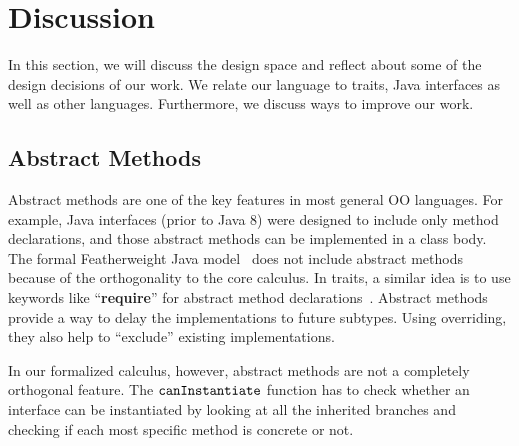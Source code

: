 \section{Discussion}\label{sec:discussion}
In this section, we will discuss the design space and reflect about some of the design decisions of our work. We relate our language to traits, Java interfaces as well as other languages. Furthermore, we discuss ways to improve our work.


\subsection{Abstract Methods}
Abstract methods are one of the key features in most general OO
languages. For example, Java interfaces (prior to Java 8) were designed
to include only method declarations, and those abstract methods can be implemented in a class body. 
The formal Featherweight Java model~\cite{Igarashi01FJ} does not include abstract methods because of the orthogonality
to the core calculus. In traits, a
similar idea is to use keywords like ``\textbf{require}'' for abstract method declarations~\cite{scharli03traits}.
Abstract methods provide a way to
delay the implementations to future subtypes. Using overriding, they also help to ``exclude'' existing implementations.

In our formalized calculus, however, abstract methods are not a completely orthogonal feature. The $\texttt{canInstantiate}$ function
has to check whether an interface can be instantiated by looking at all the inherited branches and checking if each most specific method is concrete or not.

